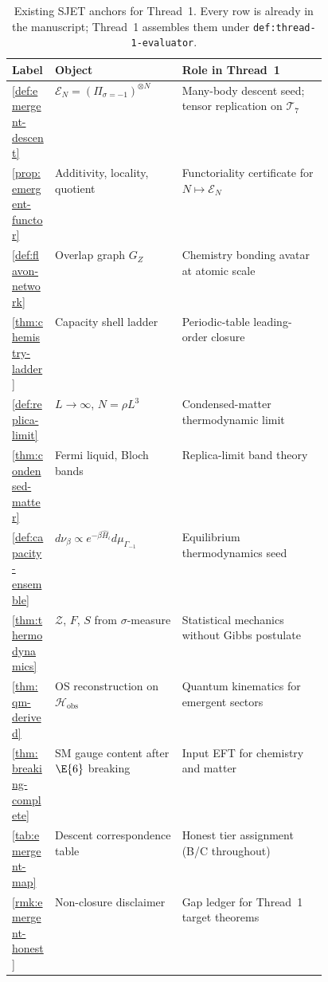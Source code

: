 \begin{table}[ht]
\centering
\small
\renewcommand{\arraystretch}{1.08}
\begin{tabular}{@{}llp{0.46\linewidth}@{}}
\toprule
\textbf{Label} & \textbf{Object} & \textbf{Role in Thread~1} \\
\midrule
\ref{def:emergent-descent} &
  $\mathcal{E}_N=(\Pi_{\sigma=-1})^{\otimes N}$ &
  Many-body descent seed; tensor replication on $\mathcal{T}_7$ \\
\ref{prop:emergent-functor} &
  Additivity, locality, quotient &
  Functoriality certificate for $N\mapsto\mathcal{E}_N$ \\
\ref{def:flavon-network} &
  Overlap graph $G_Z$ &
  Chemistry bonding avatar at atomic scale \\
\ref{thm:chemistry-ladder} &
  Capacity shell ladder &
  Periodic-table leading-order closure \\
\ref{def:replica-limit} &
  $L\to\infty$, $N=\rho L^3$ &
  Condensed-matter thermodynamic limit \\
\ref{thm:condensed-matter} &
  Fermi liquid, Bloch bands &
  Replica-limit band theory \\
\ref{def:capacity-ensemble} &
  $d\nu_\beta\propto e^{-\beta\hat H_\iota}d\mu_{\Gamma_{-1}}$ &
  Equilibrium thermodynamics seed \\
\ref{thm:thermodynamics} &
  $\mathcal{Z}$, $F$, $S$ from $\sigma$-measure &
  Statistical mechanics without Gibbs postulate \\
\ref{thm:qm-derived} &
  OS reconstruction on $\mathcal{H}_{\mathrm{obs}}$ &
  Quantum kinematics for emergent sectors \\
\ref{thm:breaking-complete} &
  SM gauge content after $\E{6}$ breaking &
  Input EFT for chemistry and matter \\
\ref{tab:emergent-map} &
  Descent correspondence table &
  Honest tier assignment (B/C throughout) \\
\ref{rmk:emergent-honest} &
  Non-closure disclaimer &
  Gap ledger for Thread~1 target theorems \\
\bottomrule
\end{tabular}
\caption{Existing SJET anchors for Thread~1. Every row is already in the
manuscript; Thread~1 assembles them under
\texttt{def:thread-1-evaluator}.}
\label{tab:thread-1-anchors}
\end{table}

